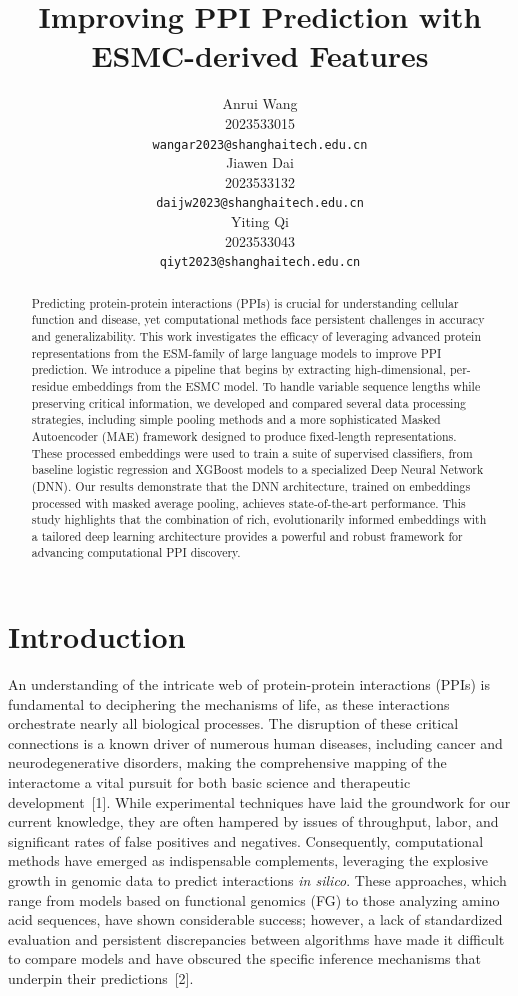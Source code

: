 \documentclass{article}
\title{Improving PPI Prediction with ESMC-derived Features}
\author{
	Anrui Wang \\
	2023533015 \\
	\texttt{wangar2023@shanghaitech.edu.cn}\\
	\AND
	Jiawen Dai \\
	2023533132 \\
	\texttt{daijw2023@shanghaitech.edu.cn}\\
	 \AND
	 Yiting Qi \\
	 2023533043 \\
	 \texttt{qiyt2023@shanghaitech.edu.cn}\\
}
\begin{document}
	
	
	\maketitle
	
	
	\begin{abstract}
		Predicting protein-protein interactions (PPIs) is crucial for understanding cellular function and disease, yet computational methods face persistent challenges in accuracy and generalizability. This work investigates the efficacy of leveraging advanced protein representations from the ESM-family of large language models to improve PPI prediction. We introduce a pipeline that begins by extracting high-dimensional, per-residue embeddings from the ESMC model. To handle variable sequence lengths while preserving critical information, we developed and compared several data processing strategies, including simple pooling methods and a more sophisticated Masked Autoencoder (MAE) framework designed to produce fixed-length representations. These processed embeddings were used to train a suite of supervised classifiers, from baseline logistic regression and XGBoost models to a specialized Deep Neural Network (DNN). Our results demonstrate that the DNN architecture, trained on embeddings processed with masked average pooling, achieves state-of-the-art performance. This study highlights that the combination of rich, evolutionarily informed embeddings with a tailored deep learning architecture provides a powerful and robust framework for advancing computational PPI discovery.
	\end{abstract}
	
	
	\section{Introduction}

	An understanding of the intricate web of protein-protein interactions (PPIs) is fundamental to deciphering the mechanisms of life, as these interactions orchestrate nearly all biological processes. The disruption of these critical connections is a known driver of numerous human diseases, including cancer and neurodegenerative disorders, making the comprehensive mapping of the interactome a vital pursuit for both basic science and therapeutic development~[1]. While experimental techniques have laid the groundwork for our current knowledge, they are often hampered by issues of throughput, labor, and significant rates of false positives and negatives. Consequently, computational methods have emerged as indispensable complements, leveraging the explosive growth in genomic data to predict interactions \emph{in silico}. These approaches, which range from models based on functional genomics (FG) to those analyzing amino acid sequences, have shown considerable success; however, a lack of standardized evaluation and persistent discrepancies between algorithms have made it difficult to compare models and have obscured the specific inference mechanisms that underpin their predictions~[2].
\end{document}
